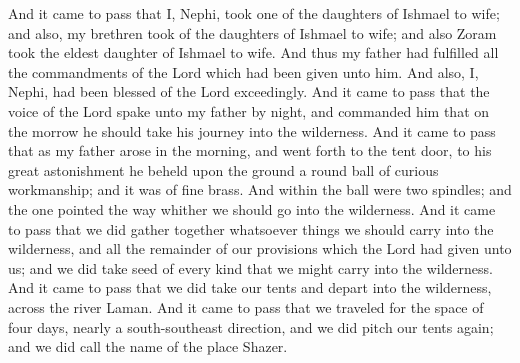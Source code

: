 And it came to pass that I, Nephi, took one of the daughters of Ishmael to wife; and also, my brethren took of the daughters of Ishmael to wife; and also Zoram took the eldest daughter of Ishmael to wife.
\bverse \iffalse And thus my father had fulfilled all the commandments of the Lord which had been given unto him. And also, I, Nephi, had been blessed of the Lord exceedingly. \fi
And thus my father had fulfilled all the commandments of the Lord which had been given unto him. And also, I, Nephi, had been blessed of the Lord exceedingly.
\bverse \iffalse And it came to pass that the voice of the Lord spake unto my father by night, and commanded him that on the morrow he should take his journey into the wilderness. \fi
And it came to pass that the voice of the Lord spake unto my father by night, and commanded him that on the morrow he should take his journey into the wilderness.
\bverse \iffalse And it came to pass that as my father arose in the morning, and went forth to the tent door, to his great astonishment he beheld upon the ground a round ball of curious workmanship; and it was of fine brass. And within the ball were two spindles; and the one pointed the way whither we should go into the wilderness. \fi
And it came to pass that as my father arose in the morning, and went forth to the tent door, to his great astonishment he beheld upon the ground a round ball of curious workmanship; and it was of fine brass. And within the ball were two spindles; and the one pointed the way whither we should go into the wilderness.
\bverse \iffalse And it came to pass that we did gather together whatsoever things we should carry into the wilderness, and all the remainder of our provisions which the Lord had given unto us; and we did take seed of every kind that we might carry into the wilderness. \fi
And it came to pass that we did gather together whatsoever things we should carry into the wilderness, and all the remainder of our provisions which the Lord had given unto us; and we did take seed of every kind that we might carry into the wilderness.
\bverse \iffalse And it came to pass that we did take our tents and depart into the wilderness, across the river Laman. \fi
And it came to pass that we did take our tents and depart into the wilderness, across the river Laman.
\bverse \iffalse And it came to pass that we traveled for the space of four days, nearly a south-southeast direction, and we did pitch our tents again; and we did call the name of the place Shazer. \fi
And it came to pass that we traveled for the space of four days, nearly a south-southeast direction, and we did pitch our tents again; and we did call the name of the place Shazer.
